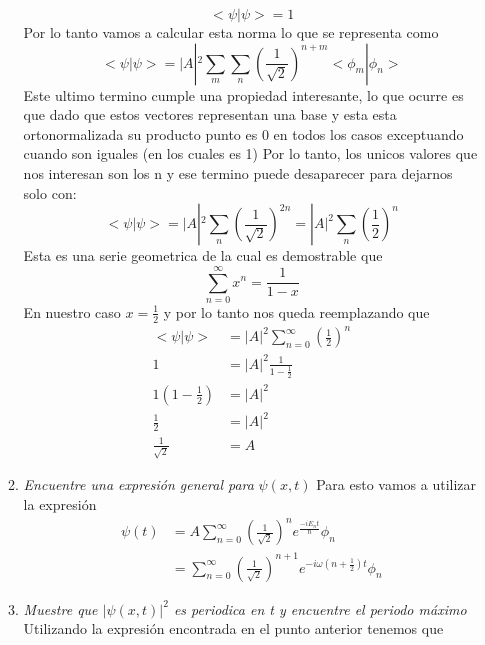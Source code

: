 \documentclass[12pt]{exam}
\begin{document}
\begin{enumerate}
\begin{enumerate}
				\begin{equation*}
				  < \psi | \psi > = 1
				\end{equation*}
				Por lo tanto vamos a calcular esta norma lo que se representa como
				\begin{equation*}
				  < \psi | \psi > = |A|^{2}\sum_{m}\sum_{n}{\left(\frac{1}{\sqrt{2}}\right)}^{n+m}<\phi_{m}|\phi_{n}>
				\end{equation*}
				Este ultimo termino cumple una propiedad interesante, lo que ocurre es que dado que estos vectores representan una base y esta esta ortonormalizada su producto punto es 0 en todos los casos exceptuando cuando son iguales (en los cuales es 1) Por lo tanto, los unicos valores que nos interesan son los n y ese termino puede desaparecer para dejarnos solo con:
				\begin{equation*}
				  < \psi | \psi > = |A|^{2}\sum_{n}{\left(\frac{1}{\sqrt{2}}\right)}^{2n}=|A|^{2}\sum_{n}{\left(\frac{1}{2}\right)}^{n}
				\end{equation*}
				Esta es una serie geometrica de la cual es demostrable que
				\begin{equation*}
				  \sum_{n=0}^{\infty} x^{n} = \frac{1}{1-x}
				\end{equation*}
				En nuestro caso $x=\frac{1}{2}$ y por lo tanto nos queda reemplazando que
				\begin{align*}
				  < \psi | \psi > &= |A|^{2}\sum_{n=0}^{\infty}{\left(\frac{1}{2}\right)}^{n}\\
				  1 &= |A|^{2}\frac{1}{1-\frac{1}{2}}\\
				  1(1-\frac{1}{2}) &= |A|^{2}\\
				  \frac{1}{2} &= |A|^{2}\\
				  \frac{1}{\sqrt{2}} &= A
				\end{align*}
		  \item \textit{Encuentre una expresión general para }$\psi(x,t)$
				Para esto vamos a utilizar la expresión
				\begin{align*}
				  \psi (t)  &= A \sum_{n=0}^{\infty}{\left(\frac{1}{\sqrt{2}}\right)}^{n}e^{\frac{-iE_{n}t}{\hbar}}\phi_{n}\\
				  &= \sum_{n=0}^{\infty}{\left(\frac{1}{\sqrt{2}}\right)}^{n+1}e^{-i\omega(n+\frac{1}{2})t}\phi_{n}
				\end{align*}
		  \item \textit{Muestre que $|\psi(x,t)|^{2}$ es periodica en t y encuentre el periodo máximo}
				Utilizando la expresión encontrada en el punto anterior tenemos que

\end{enumerate}
\end{enumerate}
\end{document}

